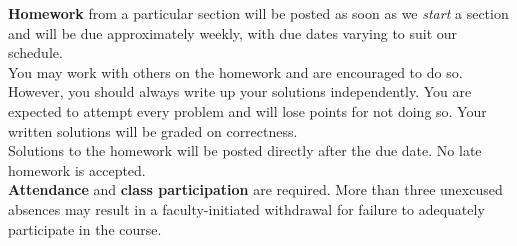 \documentclass[11pt]{article}
\begin{document}
\textbf{Homework} from a particular section will be posted as soon as we {\it{start}} a section and will be due approximately weekly, with due dates varying to suit our schedule. \\

You may work with others on the homework and are encouraged to do so. However, you should always write up your solutions independently. You are expected to attempt every problem and will lose points for not doing so. Your written solutions will be graded on correctness.\\

Solutions to the homework will be posted directly after the due date. No late homework is accepted. \\

\textbf{Attendance} and \textbf{class participation} are required. More than three unexcused absences may result in a faculty-initiated withdrawal for failure to adequately participate in the course.\\
\end{document}
